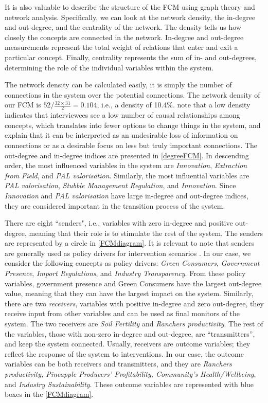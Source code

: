 It is also valuable to describe the structure of the FCM using graph theory and network analysis. Specifically, we can look at the network density, the in-degree and out-degree, and the centrality of the network. The density tells us how closely the concepts are connected in the network. In-degree and out-degree measurements represent the total weight of relations that enter and exit a particular concept. Finally, centrality represents the sum of in- and out-degrees, determining the role of the individual variables within the system.

The network density can be calculated easily, it is simply the number of connections in the system over the potential connections. The network density of our FCM is $52/\frac{32\times31}{2}=0.104$, i.e.,  a density of 10.4\%. \cite{ozesmi2004ecological} note that a low density indicates that interviewees see a low number of causal relationships among concepts, which translates into fewer options to change things in the system, and \cite{jetter2014fuzzy} explain that it can be interpreted as an undesirable loss of information on connections or as a desirable focus on less but truly important connections. The out-degree and in-degree indices are presented in \cref{degreeFCM}. In descending order, the most influenced variables in the system are \textit{Innovation}, \textit{Extraction from Field}, and \textit{PAL valorisation}. Similarly, the most influential variables are \textit{PAL valorisation}, \textit{Stubble Management Regulation}, and \textit{Innovation}. Since \textit{Innovation} and \textit{PAL valorisation} have large in-degree and out-degree indices, they are considered important in the transition process of the system.  

There are eight ``senders", i.e., variables with zero in-degree and positive out-degree, meaning that their role is to stimulate the rest of the system. The senders are represented by a circle in \cref{FCMdiagram}. It is relevant to note that senders are generally used as policy drivers for intervention scenarios \citep{morone2021using}.  In our case, we consider the following concepts as policy drivers: \textit{Green Consumers}, \textit{Government Presence}, \textit{Import Regulations}, and \textit{Industry Transparency}. From these policy variables, government presence and Green Consumers have the largest out-degree value, meaning that they can have the largest impact on the system. Similarly, there are two \textit{receivers}, variables with positive in-degree and zero out-degree, they receive input from other variables and can be used as final monitors of the system. The two receivers are \textit{Soil Fertility} and \textit{Ranchers productivity}. The rest of the variables, those with non-zero in-degree and out-degree, are “transmitters”, and keep the system connected. Usually, receivers are outcome variables; they reflect the response of the system to interventions. In our case, the outcome variables can be both receivers and transmitters, and they are \textit{Ranchers productivity, Pineapple Producers' Profitability, Community's Health/Wellbeing}, and \textit{Industry Sustainability}. These outcome variables are represented with blue boxes in the \cref{FCMdiagram}.


